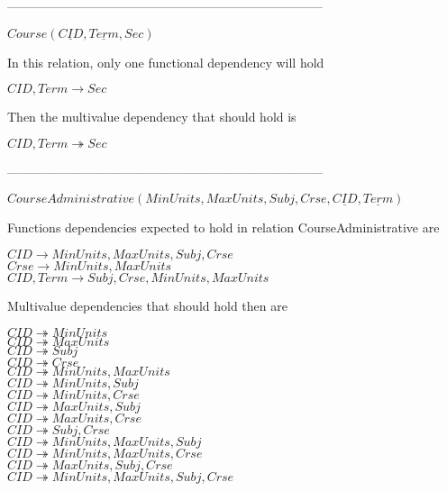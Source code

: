 ---------------------------------------------------------------------------

$Course(\underline{CID}, \underline{Term}, Sec)$

In this relation, only one functional dependency will hold

$CID, Term \rightarrow Sec$

Then the multivalue dependency that should hold is

$CID, Term \twoheadrightarrow Sec$

---------------------------------------------------------------------------

$CourseAdministrative(MinUnits, MaxUnits, Subj, Crse, \underline{CID}, \underline{Term})$

Functions dependencies expected to hold in relation CourseAdministrative are

$CID \rightarrow MinUnits,MaxUnits,Subj, Crse$\\
$Crse \rightarrow MinUnits, MaxUnits$\\
$CID,Term \rightarrow Subj,Crse,MinUnits,MaxUnits$

Multivalue dependencies that should hold then are

$CID \twoheadrightarrow MinUnits$\\
$CID \twoheadrightarrow MaxUnits$\\
$CID \twoheadrightarrow Subj$\\
$CID \twoheadrightarrow Crse$\\
$CID \twoheadrightarrow MinUnits, MaxUnits$\\
$CID \twoheadrightarrow MinUnits, Subj$\\
$CID \twoheadrightarrow MinUnits, Crse$\\
$CID \twoheadrightarrow MaxUnits, Subj$\\
$CID \twoheadrightarrow MaxUnits, Crse$\\
$CID \twoheadrightarrow Subj, Crse$\\
$CID \twoheadrightarrow MinUnits, MaxUnits, Subj$\\
$CID \twoheadrightarrow MinUnits, MaxUnits, Crse$\\
$CID \twoheadrightarrow MaxUnits, Subj, Crse$\\
$CID \twoheadrightarrow MinUnits, MaxUnits, Subj, Crse$\\

